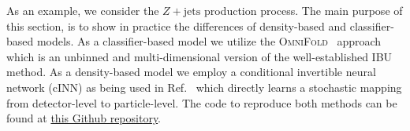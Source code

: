 \documentclass[a4paper,11pt]{article}
\begin{document}
\begin{comment}
\subsection{Toy example}
\label{sec:toy_example}
As an example\footnote{The code for this example can be found at \href{https://gist.github.com/bnachman/133ebfb17b10091d8214a043f376d5ea}{this Gist}.} Gaussian result is shown in figures~\ref{fig:examle} and~\ref{fig:example2}.  In particular, the nominal simulation is a Gaussian random variable and the `unfolded' result has a double-peak structure. These data are shown in Fig.~\ref{fig:examle} and are binned only for illustration.  The actual unbinned result is codified into the data format shown in Fig.~\ref{fig:example2}, to which any binning can be applied post-hoc.

\begin{figure}[h!]
    \centering
    \texttt{[image: Gauss.pdf]}
    \caption{An example unbinned result, shown here as a histogram for illustration.  The filled histogram is the `nominal' simulation and the black unfilled histogram corresponds to the `unfolded' result, with the black shaded region showing the systematic uncertainty.}
    \label{fig:examle}
\end{figure}

\begin{figure}[h!]
    \centering
    \texttt{[image: example.png]}
    \caption{An example result with one uncertainty.}
    \label{fig:example2}
\end{figure}

\subsection{LHC example}
\label{sec:lhc_example}
\end{comment}

As an example, we consider the $Z+\mathrm{jets}$ production process. The main purpose of this section, is to show in practice the differences of density-based and classifier-based models. As a classifier-based model we utilize the \textsc{OmniFold}~\cite{Andreassen:2019cjw} approach which is an unbinned and multi-dimensional version of the well-established IBU~\cite{DAGOSTINI1995487, 1974AJ79745L,Richardson:72} method. As a density-based model we employ a conditional invertible neural network (cINN) as being used in Ref.~\cite{Bellagente:2020piv} which directly learns a stochastic mapping from detector-level to particle-level.  The code to reproduce both methods can be found at \href{https://github.com/ramonpeter/UnbinnedMeasurements}{this Github repository}.
\end{document}
